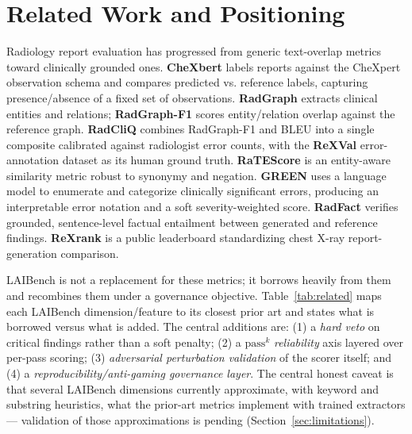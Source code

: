 \documentclass[11pt]{article}
\newcommand{\passk}{$\mathrm{pass}^{k}$}
\begin{document}
\section{Related Work and Positioning}
\label{sec:related}

Radiology report evaluation has progressed from generic text-overlap metrics
toward clinically grounded ones. \textbf{CheXbert} \cite{Smit2020CheXbert}
labels reports against the CheXpert observation schema \cite{Irvin2019CheXpert}
and compares predicted vs. reference labels, capturing presence/absence of a
fixed set of observations. \textbf{RadGraph} \cite{Jain2021RadGraph} extracts
clinical entities and relations; \textbf{RadGraph-F1} scores entity/relation
overlap against the reference graph. \textbf{RadCliQ} \cite{Yu2023RadCliQ}
combines RadGraph-F1 and BLEU into a single composite calibrated against
radiologist error counts, with the \textbf{ReXVal} \cite{Yu2023ReXVal}
error-annotation dataset as its human ground truth. \textbf{RaTEScore}
\cite{Zhao2024RaTEScore} is an entity-aware similarity metric robust to synonymy
and negation. \textbf{GREEN} \cite{Ostmeier2024GREEN} uses a language model to
enumerate and categorize clinically significant errors, producing an
interpretable error notation and a soft severity-weighted score.
\textbf{RadFact} \cite{Bannur2024RadFact} verifies grounded, sentence-level
factual entailment between generated and reference findings.
\textbf{ReXrank} \cite{Zhang2024ReXrank} is a public leaderboard standardizing
chest X-ray report-generation comparison.

LAIBench is not a replacement for these metrics; it borrows heavily from them
and recombines them under a governance objective. Table~\ref{tab:related} maps
each LAIBench dimension/feature to its closest prior art and states what is
borrowed versus what is added. The central additions are: (1) a \emph{hard veto}
on critical findings rather than a soft penalty; (2) a \passk{} \emph{reliability}
axis layered over per-pass scoring; (3) \emph{adversarial perturbation
validation} of the scorer itself; and (4) a \emph{reproducibility/anti-gaming
governance layer}. The central honest caveat is that several LAIBench dimensions
currently approximate, with keyword and substring heuristics, what the prior-art
metrics implement with trained extractors --- validation of those approximations
is pending (Section~\ref{sec:limitations}).
\end{document}
